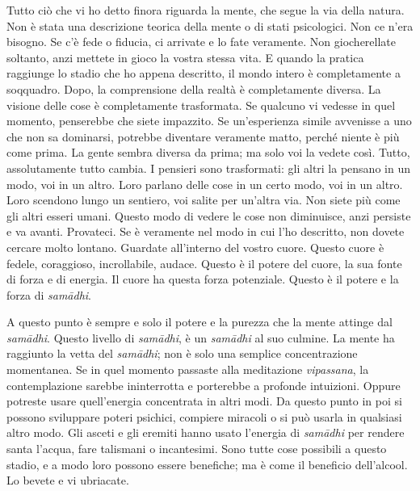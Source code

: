 Tutto ciò che vi ho detto finora riguarda la mente, che segue la via
della natura. Non è stata una descrizione teorica della mente o di stati
psicologici. Non ce n'era bisogno. Se c'è fede o fiducia, ci arrivate e
lo fate veramente. Non giocherellate soltanto, anzi mettete in gioco la
vostra stessa vita. E quando la pratica raggiunge lo stadio che ho
appena descritto, il mondo intero è completamente a soqquadro. Dopo, la
comprensione della realtà è completamente diversa. La visione delle cose
è completamente trasformata. Se qualcuno vi vedesse in quel momento,
penserebbe che siete impazzito. Se un'esperienza simile avvenisse a uno
che non sa dominarsi, potrebbe diventare veramente matto, perché niente
è più come prima. La gente sembra diversa da prima; ma solo voi la
vedete così. Tutto, assolutamente tutto cambia. I pensieri sono
trasformati: gli altri la pensano in un modo, voi in un altro. Loro
parlano delle cose in un certo modo, voi in un altro. Loro scendono
lungo un sentiero, voi salite per un'altra via. Non siete più come gli
altri esseri umani. Questo modo di vedere le cose non diminuisce, anzi
persiste e va avanti. Provateci. Se è veramente nel modo in cui l'ho
descritto, non dovete cercare molto lontano. Guardate all'interno del
vostro cuore. Questo cuore è fedele, coraggioso, incrollabile, audace.
Questo è il potere del cuore, la sua fonte di forza e di energia. Il
cuore ha questa forza potenziale. Questo è il potere e la forza di
\emph{samādhi}.

A questo punto è sempre e solo il potere e la purezza che la mente
attinge dal \emph{samādhi}. Questo livello di \emph{samādhi}, è un \emph{samādhi} al suo
culmine. La mente ha raggiunto la vetta del \emph{samādhi}; non è solo una
semplice concentrazione momentanea. Se in quel momento passaste alla
meditazione \emph{vipassana}, la contemplazione sarebbe ininterrotta e
porterebbe a profonde intuizioni. Oppure potreste usare quell'energia
concentrata in altri modi. Da questo punto in poi si possono sviluppare
poteri psichici, compiere miracoli o si può usarla in qualsiasi altro
modo. Gli asceti e gli eremiti hanno usato l'energia di \emph{samādhi} per
rendere santa l'acqua, fare talismani o incantesimi. Sono tutte cose
possibili a questo stadio, e a modo loro possono essere benefiche; ma è
come il beneficio dell'alcool. Lo bevete e vi ubriacate.


